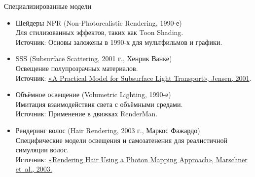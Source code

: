 \documentclass{beamer}
\begin{document}
	\begin{frame}{Специализированные модели}
		\footnotesize

		\begin{itemize}
			\item 
			Шейдеры NPR (Non-Photorealistic Rendering, 1990-е)\\
			Для стилизованных эффектов, таких как Toon Shading.\\
			{Источник:} Основы заложены в 1990-х для мультфильмов и графики.
	
			\item 
			SSS (Subsurface Scattering, 2001 г., Хенрик Ванке)\\
			Освещение полупрозрачных материалов.\\
			{Источник:} \href{https://graphics.stanford.edu/papers/bssrdf/bssrdf.pdf}{«A Practical Model for Subsurface Light Transport», Jensen, 2001}.
	
			\item 
			Объёмное освещение (Volumetric Lighting, 1990-е)\\
			Имитация взаимодействия света с объёмными средами.\\
			{Источник:} Применение в движках RenderMan.
	
			\item 
			Рендеринг волос (Hair Rendering, 2003 г., Маркос Фажардо)\\
			Специфические модели освещения и самозатенения для реалистичной симуляции волос.\\
			{Источник:} \href{https://www.cs.cornell.edu/~srm/publications/SG06-hair.pdf}{«Rendering Hair Using a Photon Mapping Approach», Marschner et~al., 2003.}
	
	
		\end{itemize}


\end{frame}
\end{document}
